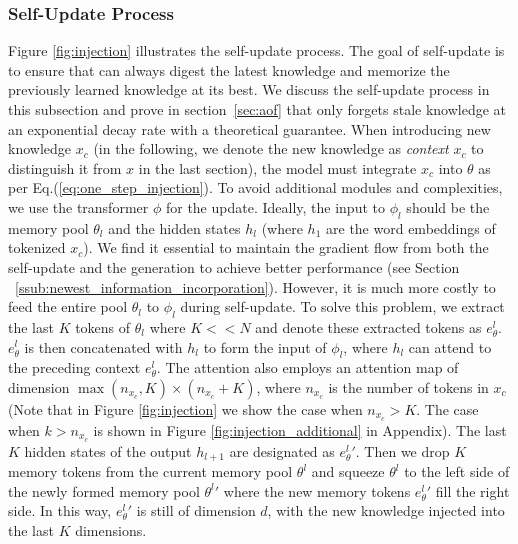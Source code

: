 \subsubsection{Self-Update Process}
\label{ssub:self_update_process}
Figure \ref{fig:injection} illustrates the self-update process. 
The goal of self-update is to ensure that \ours can always digest the latest knowledge and memorize the previously learned knowledge at its best. We discuss the self-update process in this subsection and prove in section~\ref{sec:aof} that \ours only forgets stale knowledge at an exponential decay rate with a theoretical guarantee.
When introducing new knowledge $x_c$ (in the following, we denote the new knowledge as \textit{context} $x_c$ to distinguish it from $x$ in the last section), the model must integrate $x_c$ into $\theta$ as per Eq.(\ref{eq:one_step_injection}). 
To avoid additional modules and complexities, we use the transformer $\phi$ for the update.
Ideally, the input to $\phi_l$ should be the memory pool $\theta_l$ and the hidden states $h_l$ (where $h_1$ are the word embeddings of tokenized $x_c$). We find it essential to maintain the gradient flow from both the self-update and the generation to achieve better performance (see Section ~\ref{ssub:newest_information_incorporation}). However, it is much more costly to feed the entire pool $\theta_l$ to $\phi_l$ during self-update. To solve this problem, 
we extract the last $K$ tokens of $\theta_l$ where $K<<N$ and denote these extracted tokens as $e_\theta^l$.
$e_\theta^l$ is then concatenated with $h_l$ to form the input of $\phi_l$, where $h_l$ can attend to the preceding context $e_\theta^l$.
The attention also employs an attention map of dimension
$\max(n_{x_c}, K) \times (n_{x_c} + K)$, where $n_{x_c}$ is the number of tokens in $x_c$ (Note that in Figure \ref{fig:injection} we show the case when $n_{x_c} > K$. The case when $k > n_{x_c}$ is shown in Figure \ref{fig:injection_additional} in Appendix). 
The last $K$ hidden states of the output $h_{l+1}$ are designated as ${e_\theta^l}'$. Then we drop $K$ memory tokens from the current memory pool $\theta^l$ and squeeze $\theta^l$ to the left side of the newly formed memory pool ${\theta^l}'$ where the new memory tokens ${e_\theta^l}'$ fill the right side.
In this way, ${e_\theta^l}'$ is still of dimension $d$, with the new knowledge injected into the last $K$ dimensions.

